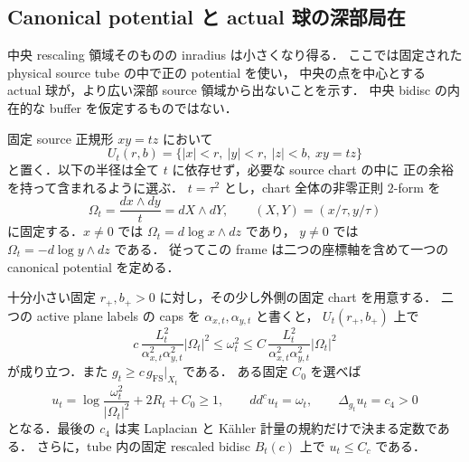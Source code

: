 \subsection{Canonical potential と actual 球の深部局在}

中央 rescaling 領域そのものの inradius は小さくなり得る．
ここでは固定された physical source tube の中で正の potential を使い，
中央の点を中心とする actual 球が，より広い深部 source 領域から出ないことを示す．
中央 bidisc の内在的な buffer を仮定するものではない．

固定 source 正規形 $xy=tz$ において
\[
 U_t(r,b)=\{|x|<r,\ |y|<r,\ |z|<b,\ xy=tz\}
\]
と置く．以下の半径は全て $t$ に依存せず，必要な source chart の中に
正の余裕を持って含まれるように選ぶ．
$t=\tau^2$ とし，chart 全体の非零正則 $2$-form を
\[
 \Omega_t=\frac{dx\wedge dy}{t}=dX\wedge dY,
 \qquad (X,Y)=(x/\tau,y/\tau)
\]
に固定する．$x\ne0$ では $\Omega_t=d\log x\wedge dz$ であり，
$y\ne0$ では $\Omega_t=-d\log y\wedge dz$ である．
従ってこの frame は二つの座標軸を含めて一つの canonical potential を定める．

\begin{lemma}
\label{ke:source-tube-potential}
十分小さい固定 $r_+,b_+>0$ に対し，その少し外側の固定 chart を用意する．
二つの active plane labels の caps を $\alpha_{x,t},\alpha_{y,t}$ と書くと，
$U_t(r_+,b_+)$ 上で
\begin{equation}\label{ke:eq:source-tube-density}
 c\,\frac{L_t^2}{\alpha_{x,t}^2\alpha_{y,t}^2}|\Omega_t|^2
 \le\omega_t^2\le
 C\,\frac{L_t^2}{\alpha_{x,t}^2\alpha_{y,t}^2}|\Omega_t|^2
\end{equation}
が成り立つ．また $g_t\ge c\,g_{\mathrm{FS}}|_{X_t}$ である．
ある固定 $C_0$ を選べば
\begin{equation}\label{ke:eq:source-positive-potential}
 u_t=\log\frac{\omega_t^2}{|\Omega_t|^2}+2R_t+C_0\ge1,
 \qquad dd^c u_t=\omega_t,
 \qquad \Delta_{g_t}u_t=c_4>0
\end{equation}
となる．最後の $c_4$ は実 Laplacian と K\"ahler 計量の規約だけで決まる定数である．
さらに，tube 内の固定 rescaled bidisc $B_t(c)$ 上で $u_t\le C_c$ である．
\end{lemma}

